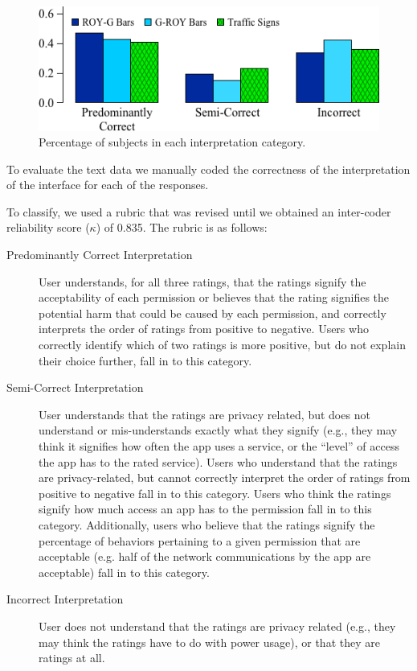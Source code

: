 \documentclass[11pt]{article}
\begin{document}
\begin{figure}
\begin{center}
\includegraphics[width=.9\linewidth]{graphs/InterpPercentages.png}
    \caption{Percentage of subjects in each interpretation category.}
    \label{text-cat}
\end{center}
\end{figure}

To evaluate the text data we manually coded  the correctness
of the interpretation of the interface for each of 
the responses.

To classify, we used a rubric that was revised until we obtained an
inter-coder reliability score ($\kappa$) of 0.835. 
The rubric is as follows:
\begin{description}

\item[Predominantly Correct Interpretation]

User understands, for all three ratings, that the ratings signify the 
acceptability of each permission or believes that the rating signifies 
the potential harm that could be caused by each permission, and correctly 
interprets the order of ratings from positive to negative. Users who 
correctly identify which of two ratings is more positive, but do not 
explain their choice further, fall in to this category.

\item[Semi-Correct Interpretation]

User understands that the ratings are privacy related, but does not 
understand or mis-understands exactly what they signify (e.g., they may 
think it signifies how often the app uses a service, or the ``level'' of 
access the app has to the rated service). Users who understand that the 
ratings are privacy-related, but cannot correctly interpret the order of 
ratings from positive to negative fall in to this category. Users who think 
the ratings signify how much access an app has to the permission fall in to 
this category. Additionally, users who believe that the ratings signify the 
percentage of behaviors pertaining to a given permission that are acceptable 
(e.g. half of the network communications by the app are acceptable) fall in 
to this category.

\item[Incorrect Interpretation]

User does not understand that the ratings are privacy related (e.g., they 
may think the ratings have to do with power usage), or that they are ratings 
at all.

\end{description}
\end{document}
